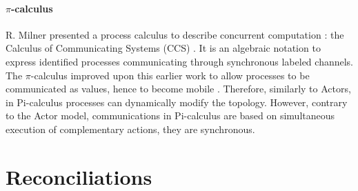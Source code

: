 
\paragraph{$\pi$-calculus}

R. Milner presented a process calculus to describe concurrent computation : the Calculus of Communicating Systems (CCS) \cite{Milner1975, Milner1980}.
It is an algebraic notation to express identified processes communicating through synchronous labeled channels.
The $\pi$-calculus improved upon this earlier work to allow processes to be communicated as values, hence to become mobile \cite{Engberg1986,Milner1992a,Milner1992}.
Therefore, similarly to Actors, in Pi-calculus processes can dynamically modify the topology.
However, contrary to the Actor model, communications in Pi-calculus are based on simultaneous execution of complementary actions, they are synchronous.












\section{Reconciliations} \label{chapter3:reconciliations}


